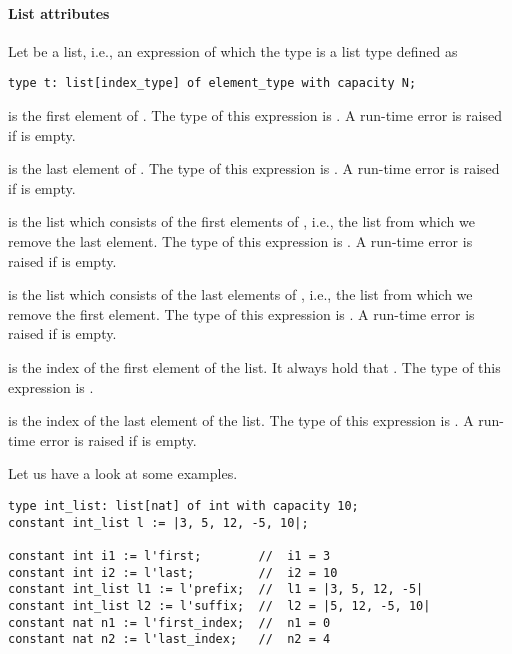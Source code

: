 \paragraph{List attributes}
Let  be a list, i.e., an expression of which the type is a
list type  defined as
\begin{lstlisting}
type t: list[index_type] of element_type with capacity N;
\end{lstlisting}
\begin{description}
\item
   is the first element of .
  The type of this expression is .
  A run-time error is raised if  is empty.
\item
   is the last element of .
  The type of this expression is .
  A run-time error is raised if  is empty.
\item
   is the list which consists of the first elements of
  , i.e., the list  from which we remove the last
  element.
  The type of this expression is .
  A run-time error is raised if  is empty.
\item
   is the list which consists of the last elements of
  , i.e., the list  from which we remove the first
  element.
  The type of this expression is .
  A run-time error is raised if  is empty.
\item
   is the index of the first element of the list.
  It always hold that .
  The type of this expression is .
\item
   is the index of the last element of the list.
  The type of this expression is .
  A run-time error is raised if  is empty.
\end{description}
Let us have a look at some examples.
\begin{lstlisting}
type int_list: list[nat] of int with capacity 10;
constant int_list l := |3, 5, 12, -5, 10|;

constant int i1 := l'first;        //  i1 = 3
constant int i2 := l'last;         //  i2 = 10
constant int_list l1 := l'prefix;  //  l1 = |3, 5, 12, -5|
constant int_list l2 := l'suffix;  //  l2 = |5, 12, -5, 10|
constant nat n1 := l'first_index;  //  n1 = 0
constant nat n2 := l'last_index;   //  n2 = 4
\end{lstlisting}

